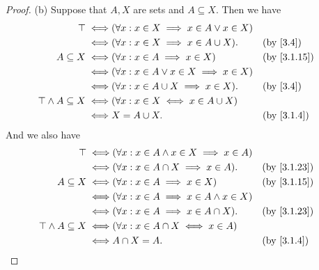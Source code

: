 \begin{proof}{(b)}
  Suppose that \(A, X\) are sets and \(A \subseteq X\).
  Then we have
  \begin{align*}
    \top \iff                     & (\forall x : x \in X \implies x \in A \lor x \in X)                                \\
    \iff                          & (\forall x : x \in X \implies x \in A \cup X).      &  & \text{(by \cref{3.4})}    \\
    A \subseteq X \iff            & (\forall x : x \in A \implies x \in X)              &  & \text{(by \cref{3.1.15})} \\
    \iff                          & (\forall x : x \in A \lor x \in X \implies x \in X)                                \\
    \iff                          & (\forall x : x \in A \cup X \implies x \in X).      &  & \text{(by \cref{3.4})}    \\
    \top \land A \subseteq X \iff & (\forall x : x \in X \iff x \in A \cup X)                                          \\
    \iff                          & X = A \cup X.                                       &  & \by{3.1.4}
  \end{align*}
  And we also have
  \begin{align*}
    \top \iff                     & (\forall x : x \in A \land x \in X \implies x \in A)                                \\
    \iff                          & (\forall x : x \in A \cap X \implies x \in A).       &  & \text{(by \cref{3.1.23})} \\
    A \subseteq X \iff            & (\forall x : x \in A \implies x \in X)               &  & \text{(by \cref{3.1.15})} \\
    \iff                          & (\forall x : x \in A \implies x \in A \land x \in X)                                \\
    \iff                          & (\forall x : x \in A \implies x \in A \cap X).       &  & \text{(by \cref{3.1.23})} \\
    \top \land A \subseteq X \iff & (\forall x : x \in A \cap X \iff x \in A)                                           \\
    \iff                          & A \cap X = A.                                        &  & \by{3.1.4}
  \end{align*}
\end{proof}

